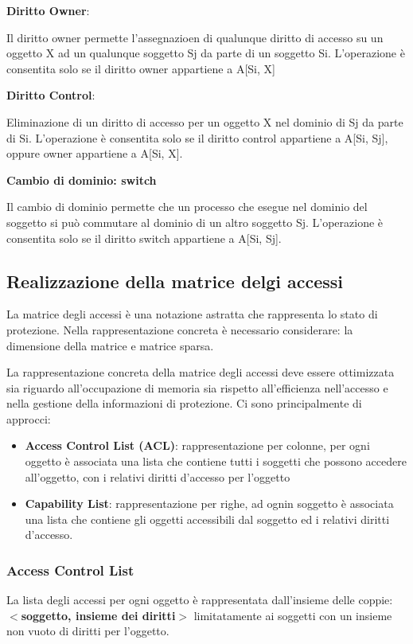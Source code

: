 \documentclass{article}
\begin{document}
\textbf{Diritto Owner}:
\vspace{3mm}

Il diritto owner permette l'assegnazioen di qualunque diritto di accesso su un oggetto X ad un qualunque soggetto Sj da parte di un soggetto Si. L'operazione è consentita solo
se il diritto owner appartiene a A[Si, X]

\vspace{3mm}
\textbf{Diritto Control}:
\vspace{3mm}

Eliminazione di un diritto di accesso per un oggetto X nel dominio di Sj da parte di Si. L'operazione è consentita solo se il diritto control appartiene a A[Si, Sj], oppure owner
appartiene a A[Si, X].

\vspace{3mm}
\textbf{Cambio di dominio: switch}
\vspace{3mm}

Il cambio di dominio permette che un processo che esegue nel dominio del soggetto si può commutare al dominio di un altro soggetto Sj.
L'operazione è consentita solo se il diritto switch appartiene a A[Si, Sj].

\subsection{Realizzazione della matrice delgi accessi}
La matrice degli accessi è una notazione astratta che rappresenta lo stato di protezione. Nella rappresentazione concreta è necessario considerare: la dimensione della matrice e matrice 
sparsa.

La rappresentazione concreta della matrice degli accessi deve essere ottimizzata sia riguardo all'occupazione di memoria sia rispetto all'efficienza nell'accesso e nella gestione della
informazioni di protezione.
Ci sono principalmente di approcci:
\begin{itemize}
    \item \textbf{Access Control List (ACL)}: rappresentazione per colonne, per ogni oggetto è associata una lista che contiene tutti i soggetti che possono accedere all'oggetto, con i relativi diritti
    d'accesso per l'oggetto
    \item \textbf{Capability List}: rappresentazione per righe, ad ognin soggetto è associata una lista che contiene gli oggetti accessibili dal soggetto ed i relativi diritti d'accesso.
\end{itemize}

\subsubsection{Access Control List}
La lista degli accessi per ogni oggetto è rappresentata dall'insieme delle coppie: \textbf{$<$soggetto, insieme dei diritti$>$}
limitatamente ai soggetti con un insieme non vuoto di diritti per l'oggetto.
\end{document}
